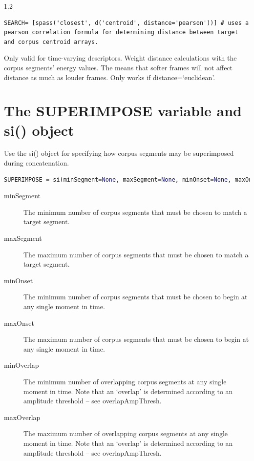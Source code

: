 \documentclass{article}
\begin{document}
\begin{spacing}{1.2}
\begin{description}
\begin{lstlisting}
SEARCH= [spass('closest', d('centroid', distance='pearson'))] # uses a pearson correlation formula for determining distance between target and corpus centroid arrays.
\end{lstlisting}

\item[energyWeight] Only valid for time-varying descriptors.  Weight distance calculations with the corpus segments' energy values.  The means that softer frames will not affect distance as much as louder frames.  Only works if distance=`euclidean'.
\end{description}


\section{The SUPERIMPOSE variable and si() object}
Use the si() object for specifying how corpus segments may be superimposed during concatenation.

 \begin{lstlisting}[language=python]
SUPERIMPOSE = si(minSegment=None, maxSegment=None, minOnset=None, maxOnset=8, minOverlap=None, maxOverlap=None, searchOrder='power', calcMethod='mixture', peakAlign=False)
\end{lstlisting}
 
\begin{description}

\item[minSegment] The minimum number of corpus segments that must be chosen to match a target segment.
\item[maxSegment] The maximum number of corpus segments that must be chosen to match a target segment.
\item[minOnset] The minimum number of corpus segments that must be chosen to begin at any single moment in time.
\item[maxOnset] The maximum number of corpus segments that must be chosen to begin at any single moment in time.
\item[minOverlap] The minimum number of overlapping corpus segments at any single moment in time.  Note that an `overlap' is determined according to an amplitude threshold -- see overlapAmpThresh.
\item[maxOverlap] The maximum number of overlapping corpus segments at any single moment in time.  Note that an `overlap' is determined according to an amplitude threshold -- see overlapAmpThresh.


\end{description}
\end{spacing}
\end{document}
